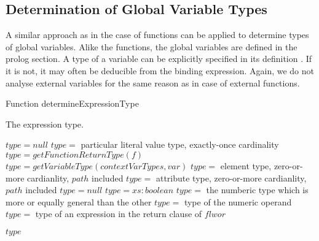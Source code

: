 \subsection{Determination of Global Variable Types}
A similar approach as in the case of functions can be applied to determine types of global variables. Alike the functions, the global variables are defined in the prolog section. A type of a variable can be explicitly specified in its definition . If it is not, it may often be deducible from the binding expression. Again, we do not analyse external variables for the same reason as in case of external functions.

\begin{algorithm}
\caption{Function determineExpressionType}
\label{ALG_func_determineExpressionType}
\begin{algorithmic}[1]
\ENSURE The expression type.

\STATE $type = null$
     \STATE $type =$ particular literal value type, exactly-once cardinality
     \STATE $type = getFunctionReturnType(f)$
     \STATE $type = getVariableType(contextVarTypes, var)$
         \STATE $type =$ element type, zero-or-more cardianlity, $path$ included
         \STATE $type =$ attribute type, zero-or-more cardianlity, $path$ included
     \ELSE
         \STATE $type = null$
     \ENDIF
{}
         \STATE $type = xs:boolean$
             \STATE $type =$ the numberic type which is more or equally general than the other
         \ELSE
             \STATE $type =$ type of the numeric operand
         \ENDIF
     \ENDIF
{}
     \STATE  $type =$ type of an expression in the return clause of $flwor$
\ENDIF

\RETURN $type$
\end{algorithmic}
\end{algorithm}

